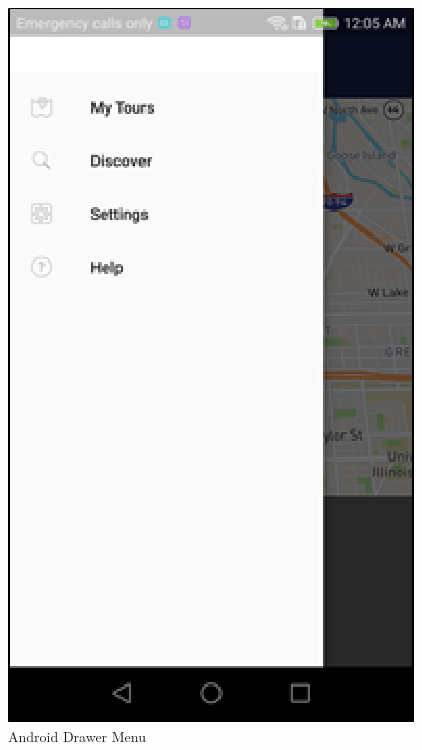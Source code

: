\documentclass[letterpaper, 10pt,titlepage]{article}
\begin{document}
\begin{figure}[ht]
    \centering
    \includegraphics[scale=1.2]{android3}
    \caption{Android Drawer Menu}
    \label{charles3}
\end{figure}
\end{document}
